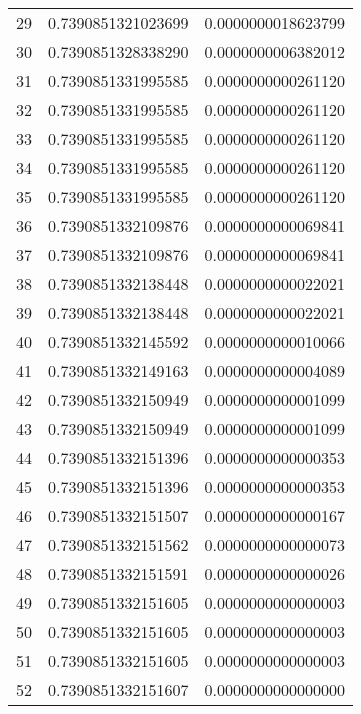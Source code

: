 \begin{tabular}{lrr}
29 & 0.7390851321023699 & 0.0000000018623799  \\
30 & 0.7390851328338290 & 0.0000000006382012  \\
31 & 0.7390851331995585 & 0.0000000000261120  \\
32 & 0.7390851331995585 & 0.0000000000261120  \\
33 & 0.7390851331995585 & 0.0000000000261120  \\
34 & 0.7390851331995585 & 0.0000000000261120  \\
35 & 0.7390851331995585 & 0.0000000000261120  \\
36 & 0.7390851332109876 & 0.0000000000069841  \\
37 & 0.7390851332109876 & 0.0000000000069841  \\
38 & 0.7390851332138448 & 0.0000000000022021  \\
39 & 0.7390851332138448 & 0.0000000000022021  \\
40 & 0.7390851332145592 & 0.0000000000010066  \\
41 & 0.7390851332149163 & 0.0000000000004089  \\
42 & 0.7390851332150949 & 0.0000000000001099  \\
43 & 0.7390851332150949 & 0.0000000000001099  \\
44 & 0.7390851332151396 & 0.0000000000000353  \\
45 & 0.7390851332151396 & 0.0000000000000353  \\
46 & 0.7390851332151507 & 0.0000000000000167  \\
47 & 0.7390851332151562 & 0.0000000000000073  \\
48 & 0.7390851332151591 & 0.0000000000000026  \\
49 & 0.7390851332151605 & 0.0000000000000003  \\
50 & 0.7390851332151605 & 0.0000000000000003  \\
51 & 0.7390851332151605 & 0.0000000000000003  \\
52 & 0.7390851332151607 & 0.0000000000000000  \\
\end{tabular}
